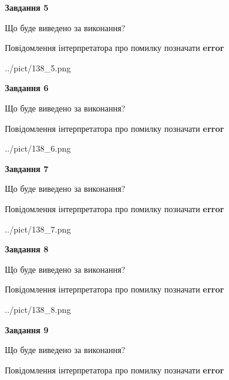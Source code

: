 \documentclass[11pt, ukrainian]{article}
\begin{document}
{\begin {large}
{\begin {center}\textbf{Завдання 5}\end {center}}\par
Що буде виведено за виконання? \par
Повідомлення інтерпретатора про помилку позначати \textbf{error}

\begin{center}
	{../pict/138_5.png}
\end{center}
\newpage

{\begin {center}\textbf{Завдання 6}\end {center}}\par
Що буде виведено за виконання? \par
Повідомлення інтерпретатора про помилку позначати \textbf{error}

\begin{center}
	{../pict/138_6.png}
\end{center}
\newpage

{\begin {center}\textbf{Завдання 7}\end {center}}\par
Що буде виведено за виконання? \par
Повідомлення інтерпретатора про помилку позначати \textbf{error}

\begin{center}
	{../pict/138_7.png}
\end{center}
\newpage

{\begin {center}\textbf{Завдання 8}\end {center}}\par
Що буде виведено за виконання? \par
Повідомлення інтерпретатора про помилку позначати \textbf{error}

\begin{center}
	{../pict/138_8.png}
\end{center}
\newpage

{\begin {center}\textbf{Завдання 9}\end {center}}\par
Що буде виведено за виконання? \par
Повідомлення інтерпретатора про помилку позначати \textbf{error}


\end{large}}
\end{document}
